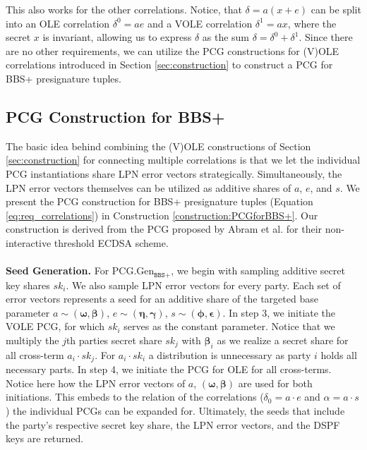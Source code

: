 This also works for the other correlations. Notice, that $\delta = a(x+e)$ can be split into an OLE correlation $\delta^0 = ae$ and a VOLE correlation $\delta^1 = ax$, where the secret $x$ is invariant, allowing us to express $\delta$ as the sum $\delta = \delta^0 + \delta^1$. Since there are no other requirements, we can utilize the PCG constructions for (V)OLE correlations introduced in Section \ref{sec:construction} to construct a PCG for BBS+ presignature tuples.

\subsection{PCG Construction for BBS+}
The basic idea behind combining the (V)OLE constructions of Section \ref{sec:construction} for connecting multiple correlations is that we let the individual PCG instantiations share LPN error vectors strategically. Simultaneously, the LPN error vectors themselves can be utilized as additive shares of $a$, $e$, and $s$. We present the PCG construction for BBS+ presignature tuples (Equation \ref{eq:req_correlations}) in Construction \ref{construction:PCGforBBS+}. Our construction is derived from the PCG proposed by Abram et al. \cite{abram2022low} for their non-interactive threshold ECDSA scheme.
\\\\
\textbf{Seed Generation.} For PCG.Gen$_{\texttt{BBS+}}$, we begin with sampling additive secret key shares $sk_i$. We also sample LPN error vectors for every party. Each set of error vectors represents a seed for an additive share of the targeted base parameter $a \sim (\boldsymbol{\omega}, \boldsymbol{\beta})$, $e \sim (\boldsymbol{\eta}, \boldsymbol{\gamma})$, $s \sim (\boldsymbol{\phi}, \boldsymbol{\epsilon})$. In step 3, we initiate the VOLE PCG, for which $sk_i$ serves as the constant parameter. Notice that we multiply the $j$th parties secret share $sk_j$ with $\boldsymbol{\beta}_i$ as we realize a secret share for all cross-term $a_i\cdot sk_j$. For $a_i\cdot sk_i$ a distribution is unnecessary as party $i$ holds all necessary parts. In step 4, we initiate the PCG for OLE for all cross-terms. Notice here how the LPN error vectors of $a$, $(\boldsymbol{\omega}, \boldsymbol{\beta})$ are used for both initiations. This embeds to the relation of the correlations ($\delta_0 = a\cdot e$ and $\alpha = a\cdot s$) the individual PCGs can be expanded for. Ultimately, the seeds that include the party's respective secret key share, the LPN error vectors, and the DSPF keys are returned.
